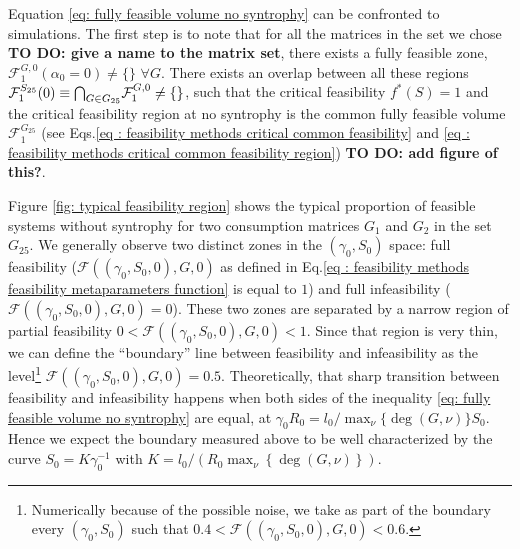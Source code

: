 \documentclass[12pt, titlepage]{report}
\begin{document}
Equation \eqref{eq: fully feasible volume no syntrophy} can be confronted to simulations.
The first step is to note that for all the matrices in the set we chose \textbf{TO DO: give a name to the matrix set}, there exists a fully feasible zone, \ie $\mathcal{F}^{G, 0}_1(\alpha_0=0) \neq \{\}$ $ \forall G$. There exists an overlap between all these regions $\mathcal{F}_1^{S_{25}}(0) \equiv {\bigcap}_{G \in G_{25}} \mathcal{F}^{G,0}_1 \neq \{\}$, such that the critical feasibility $f^*(S)=1$ and the critical feasibility region at no syntrophy is the common fully feasible volume $\mathcal{F}_1^{G_{25}}$ (see Eqs.\eqref{eq : feasibility methods critical common feasibility} and \eqref{eq : feasibility methods critical common feasibility region}) \textbf{TO DO: add figure of this?}.

Figure \ref{fig: typical feasibility region} shows the typical proportion of feasible systems without syntrophy %
for two consumption matrices $G_1$ and $G_2$ in the set $G_{25}$.
We generally observe two distinct zones in the $(\gamma_0, S_0)$ space: full feasibility ($\mathcal{F}\left((\gamma_0, S_0, 0), G, 0\right)$ as defined in Eq.\eqref{eq : feasibility methods feasibility metaparameters function} is equal to $1$) and full infeasibility ($\mathcal{F}\left((\gamma_0, S_0, 0), G, 0\right)=0$). These two zones are separated by a narrow region of partial feasibility $0 <\mathcal{F}\left((\gamma_0, S_0, 0), G, 0\right)<1$. Since that region is very thin, we can define  the ``boundary'' line between feasibility and infeasibility as the level\footnote{Numerically because of the possible noise, we take as part of the boundary every $(\gamma_0, S_0)$ such that $0.4 < \mathcal{F}\left((\gamma_0, S_0, 0), G, 0\right)<0.6$.} $\mathcal{F}\left((\gamma_0, S_0, 0), G, 0\right)=0.5$. Theoretically, that sharp transition between feasibility and infeasibility happens when both sides of the inequality \eqref{eq: fully feasible volume no syntrophy} are equal, \ie at $\gamma_0 R_0 = l_0/\max_\nu\{\deg(G,\nu)\}S_0$. Hence we expect the boundary measured above to be well characterized by the curve $S_0 = K \gamma_0^{-1}$ with $K=l_0/(R_0 \max_\nu\left\{\deg(G,\nu)\right\})$.
\end{document}

